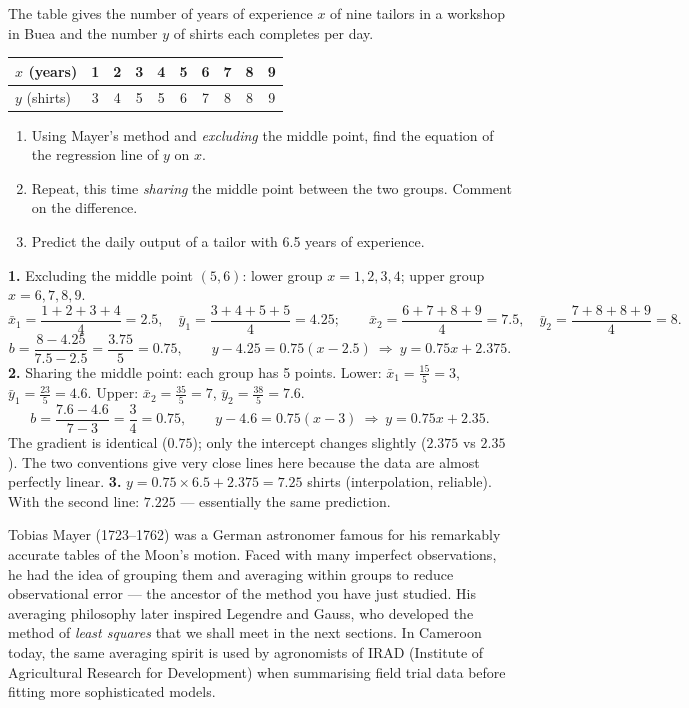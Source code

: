 \documentclass[11pt]{article}
\begin{document}
\begin{exercice}
The table gives the number of years of experience $x$ of nine tailors in a workshop in Buea and the number $y$ of shirts each completes per day.
\begin{center}
\begin{tabular}{|l|c|c|c|c|c|c|c|c|c|}
\hline
\rowcolor{popblueL} $x$ (years) & 1 & 2 & 3 & 4 & 5 & 6 & 7 & 8 & 9 \\
\hline
\rowcolor{popblueL} $y$ (shirts) & 3 & 4 & 5 & 5 & 6 & 7 & 8 & 8 & 9 \\
\hline
\end{tabular}
\end{center}
\begin{enumerate}
\item Using Mayer's method and \emph{excluding} the middle point, find the equation of the regression line of $y$ on $x$.
\item Repeat, this time \emph{sharing} the middle point between the two groups. Comment on the difference.
\item Predict the daily output of a tailor with 6.5 years of experience.
\end{enumerate}
\end{exercice}

\begin{corrige}[Exercise 1]
\textbf{1.} Excluding the middle point $(5,6)$: lower group $x=1,2,3,4$; upper group $x=6,7,8,9$.
\[
\bar{x}_1=\frac{1+2+3+4}{4}=2.5,\quad \bar{y}_1=\frac{3+4+5+5}{4}=4.25;\qquad
\bar{x}_2=\frac{6+7+8+9}{4}=7.5,\quad \bar{y}_2=\frac{7+8+8+9}{4}=8.
\]
\[
b=\frac{8-4.25}{7.5-2.5}=\frac{3.75}{5}=0.75,\qquad
y-4.25=0.75(x-2.5)\ \Longrightarrow\ y=0.75x+2.375.
\]
\textbf{2.} Sharing the middle point: each group has 5 points. Lower: $\bar{x}_1=\frac{15}{5}=3$, $\bar{y}_1=\frac{23}{5}=4.6$. Upper: $\bar{x}_2=\frac{35}{5}=7$, $\bar{y}_2=\frac{38}{5}=7.6$.
\[
b=\frac{7.6-4.6}{7-3}=\frac{3}{4}=0.75,\qquad y-4.6=0.75(x-3)\ \Longrightarrow\ y=0.75x+2.35.
\]
The gradient is identical ($0.75$); only the intercept changes slightly ($2.375$ vs $2.35$). The two conventions give very close lines here because the data are almost perfectly linear.
\textbf{3.} $y=0.75\times6.5+2.375=7.25$ shirts (interpolation, reliable). With the second line: $7.225$ --- essentially the same prediction.
\end{corrige}

\begin{savaistu}
Tobias Mayer (1723--1762) was a German astronomer famous for his remarkably accurate tables of the Moon's motion. Faced with many imperfect observations, he had the idea of grouping them and averaging within groups to reduce observational error --- the ancestor of the method you have just studied. His averaging philosophy later inspired Legendre and Gauss, who developed the method of \emph{least squares} that we shall meet in the next sections. In Cameroon today, the same averaging spirit is used by agronomists of IRAD (Institute of Agricultural Research for Development) when summarising field trial data before fitting more sophisticated models.
\end{savaistu}
\end{document}
